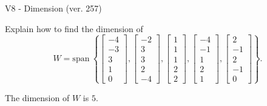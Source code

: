 \begin{exercise}
  \begin{exerciseTitle}V8 - Dimension (ver. 257)\end{exerciseTitle}
  \begin{exerciseStatement}
    Explain how to find the dimension of 
\[W=\mathrm{span}\ \left\{\left[\begin{array}{r}
-4 \\
-3 \\
3 \\
1 \\
0
\end{array}\right] , \left[\begin{array}{r}
-2 \\
3 \\
3 \\
2 \\
-4
\end{array}\right] , \left[\begin{array}{r}
1 \\
1 \\
1 \\
2 \\
2
\end{array}\right] , \left[\begin{array}{r}
-4 \\
-1 \\
1 \\
2 \\
1
\end{array}\right] , \left[\begin{array}{r}
2 \\
-1 \\
2 \\
-1 \\
0
\end{array}\right]\right\}.\]



  \end{exerciseStatement}
  \begin{exerciseAnswer}
   The dimension of \(W\) is  \(5\).
  


  \end{exerciseAnswer}
\end{exercise}